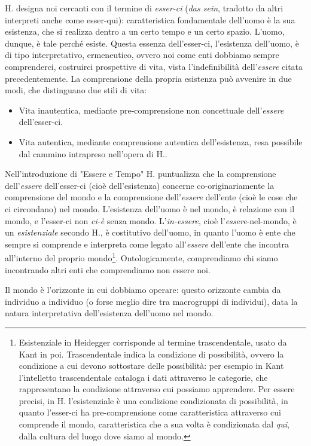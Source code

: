 \documentclass[a4paper,12pt,oneside]{article}%
\begin{document}
H. designa noi cercanti con il termine di \textit{esser-ci} (\textit{das sein}, tradotto da altri interpreti anche come esser-qui): caratteristica fondamentale dell’uomo è la sua esistenza, che si realizza dentro a un certo tempo e un certo spazio. L’uomo, dunque, è tale perché esiste. Questa essenza dell'esser-ci, l'esistenza dell'uomo, è di tipo interpretativo, ermeneutico, ovvero noi come enti dobbiamo sempre comprenderci, costruirci prospettive di vita, vista l'indefinibilità dell'\textit{essere} citata precedentemente. La comprensione della propria esistenza può avvenire in due modi, che distinguano due stili di vita:

\begin{itemize}
	\item Vita inautentica, mediante pre-comprensione non concettuale dell'\textit{essere} dell'esser-ci.
	\item Vita autentica, mediante comprensione autentica dell'esistenza, resa possibile dal cammino intrapreso nell'opera di H..
\end{itemize} 
	
Nell'introduzione di "Essere e Tempo" H. puntualizza che la comprensione dell'\textit{essere} dell'esser-ci (cioè dell'esistenza) concerne co-originariamente la comprensione del mondo e la comprensione dell'\textit{essere} dell'ente (cioè le cose che ci circondano) nel mondo. L'esistenza dell'uomo è nel mondo, è relazione con il mondo, e l'esser-ci non \textit{ci-è} senza mondo. L'\textit{in-essere}, cioè l'\textit{essere}-nel-mondo, è un \textit{esistenziale} secondo H., è costitutivo dell'uomo, in quanto l'uomo è ente che sempre si comprende e interpreta come legato all'\textit{essere} dell'ente che incontra all'interno del proprio mondo\footnote{Esistenziale in Heidegger corrisponde al termine trascendentale, usato da Kant in poi. Trascendentale indica la condizione di possibilità, ovvero la condizione a cui devono sottostare delle possibilità: per esempio in Kant l'intelletto trascendentale cataloga i dati attraverso le categorie, che rappresentano la condizione attraverso cui possiamo apprendere. Per essere precisi, in H. l'esistenziale è una condizione condizionata di possibilità, in quanto l'esser-ci ha pre-comprensione come caratteristica attraverso cui comprende il mondo, caratteristica che a sua volta è condizionata dal \textit{qui}, dalla cultura del luogo dove siamo al mondo.}. Ontologicamente, comprendiamo chi siamo incontrando altri enti che comprendiamo non essere noi.

Il mondo è l'orizzonte in cui dobbiamo operare: questo orizzonte cambia da individuo a individuo (o forse meglio dire tra macrogruppi di individui), data la natura interpretativa dell'esistenza dell'uomo nel mondo.
\end{document}
